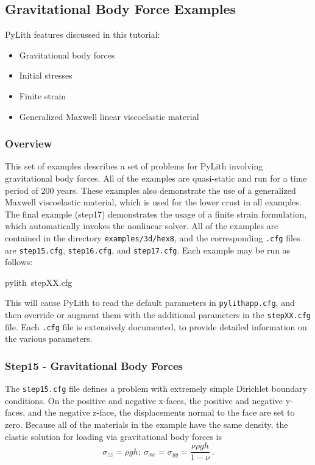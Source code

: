 
\subsection{\label{sec:Tutorial-3d-hex8-gravity}Gravitational Body Force Examples}

PyLith features discussed in this tutorial:
\begin{itemize}
\item Gravitational body forces
\item Initial stresses
\item Finite strain
\item Generalized Maxwell linear viscoelastic material
\end{itemize}

\subsubsection{Overview}

This set of examples describes a set of problems for PyLith involving
gravitational body forces. All of the examples are quasi-static and
run for a time period of 200 years. These examples also demonstrate
the use of a generalized Maxwell viscoelastic material, which is used
for the lower crust in all examples. The final example (step17) demonstrates
the usage of a finite strain formulation, which automatically invokes
the nonlinear solver. All of the examples are contained in the directory
\texttt{examples/3d/hex8}, and the corresponding \texttt{.cfg} files
are \texttt{step15.cfg}, \texttt{step16.cfg}, and \texttt{step17.cfg}.
Each example may be run as follows:
\begin{lyxcode}
pylith~stepXX.cfg
\end{lyxcode}
This will cause PyLith to read the default parameters in \texttt{pylithapp.cfg},
and then override or augment them with the additional parameters in
the \texttt{stepXX.cfg} file. Each \texttt{.cfg} file is extensively
documented, to provide detailed information on the various parameters.


\subsubsection{Step15 - Gravitational Body Forces}

The \texttt{step15.cfg} file defines a problem with extremely simple
Dirichlet boundary conditions. On the positive and negative x-faces,
the positive and negative y-faces, and the negative z-face, the displacements
normal to the face are set to zero. Because all of the materials in
the example have the same density, the elastic solution for loading
via gravitational body forces is
\begin{equation}
\sigma_{zz}=\rho gh;\:\sigma_{xx}=\sigma_{yy}=\frac{\nu\rho gh}{1-\nu}\:.\label{eq:1-1}
\end{equation}


